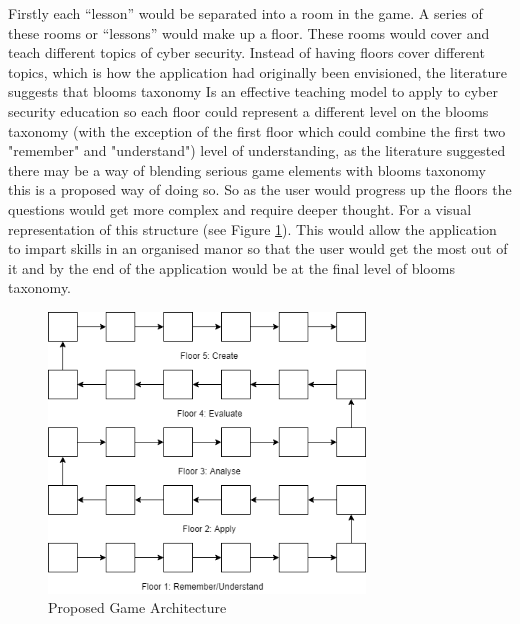 \documentclass[12pt,a4paper]{article}
\begin{document}
Firstly each “lesson” would be separated into a room in the game. A series of these rooms or “lessons” would make up a floor. These rooms would cover and teach different topics of cyber security. Instead of having floors cover different topics, which is how the application had originally been envisioned, the literature suggests that blooms taxonomy Is an effective teaching model to apply to cyber security education so each floor could represent a different level on the blooms taxonomy (with the exception of the first floor which could combine the first two "remember" and "understand") level of understanding, as the literature suggested there may be a way of blending serious game elements with blooms taxonomy \cite{buchanan2011blending2} this is a proposed way of doing so. So as the user would progress up the floors the questions would get more complex and require deeper thought. For a visual representation of this structure (see Figure \ref{gamearch}).  This would allow the application to impart skills in an organised manor so that the user would get the most out of it and by the end of the application would be at the final level of blooms taxonomy. 

\begin{figure}[h]
    \centering
    \includegraphics[width=0.75\textwidth]{Figs/gamearch.png} 
    \caption{Proposed Game Architecture} 
    \label{gamearch}
\end{figure}
\end{document}
